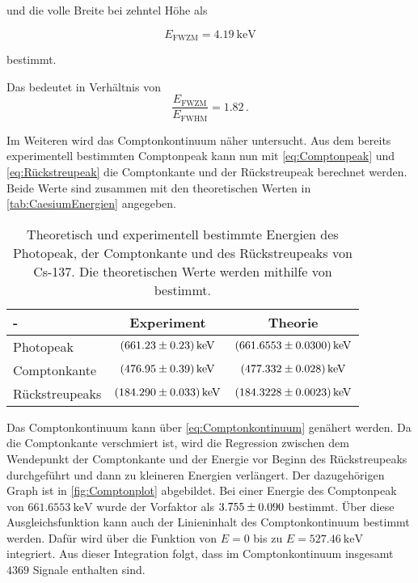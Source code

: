 und die volle Breite bei zehntel Höhe als

\begin{equation*}
    E_{\text{FWZM}} =  \SI{4.19}{\kilo\eV}
\end{equation*}

bestimmt. 

Das bedeutet in Verhältnis von 
\begin{equation*}
    \frac{E_{\text{FWZM}}}{E_{\text{FWHM}}} = 1.82\,.
\end{equation*}

Im Weiteren wird das Comptonkontinuum näher untersucht.
Aus dem bereits experimentell bestimmten Comptonpeak kann nun mit \autoref{eq:Comptonpeak} und \autoref{eq:Rückstreupeak} %
 die Comptonkante und der Rückstreupeak berechnet werden.
Beide Werte sind zusammen mit den theoretischen Werten in \autoref{tab:CaesiumEnergien} angegeben.

\begin{table}
    \centering
    \caption{Theoretisch und experimentell bestimmte Energien des Photopeak, der Comptonkante und des Rückstreupeaks von Cs-137. Die theoretischen Werte werden mithilfe von \cite{LNHB} bestimmt.}
    \label{tab:CaesiumEnergien}
    \begin{tabular}{l S[table-format=3.2(4), separate-uncertainty] S[table-format=3.4(4), separate-uncertainty]}
        \toprule
        {-} & {Experiment} & {Theorie}\\
        \midrule 
        Photopeak       & $\SI{661.23 \pm 0.23 }{\kilo\eV}$ & $\SI{661.6553 \pm 0.030}{\kilo\eV}$  \\ 
        Comptonkante    & $\SI{476.95 \pm 0.39 }{\kilo\eV}$ & $\SI{477.332 \pm 0.028}{\kilo\eV}$    \\ 
        Rückstreupeaks  & $\SI{184.290 \pm 0.033 }{\kilo\eV}$ & $\SI{184.3228 \pm 0.0023}{\kilo\eV}$  \\ 
        \bottomrule
    \end{tabular}
\end{table}

Das Comptonkontinuum kann über \autoref{eq:Comptonkontinuum} %
genähert werden. 
Da die Comptonkante verschmiert ist, wird die Regression zwischen dem Wendepunkt der Comptonkante und der Energie vor Beginn des Rückstreupeaks durchgeführt und dann zu kleineren Energien verlängert.
Der dazugehörigen Graph ist in \autoref{fig:Comptonplot} abgebildet. 
Bei einer Energie des Comptonpeak von $\SI{661.6553}{\kilo\eV}$ wurde der Vorfaktor als $\num{3.755 \pm 0.090}$ bestimmt.
Über diese Ausgleichsfunktion kann auch der Linieninhalt des Comptonkontinuum bestimmt werden.
Dafür wird über die Funktion von $E = 0$ bis zu $E = \SI{527.46}{\kilo\eV}$ integriert.
Aus dieser Integration folgt, dass im Comptonkontinuum insgesamt $\num{4369}$ Signale enthalten sind.\\ 

